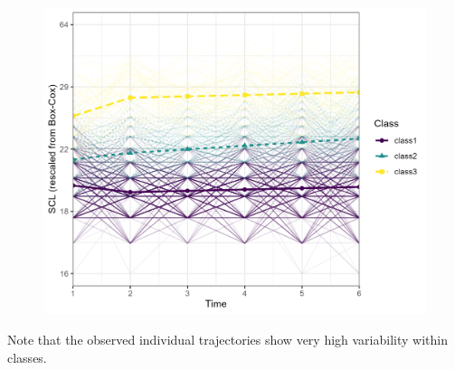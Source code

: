 \documentclass[
  man,floatsintext]{apa6}
\begin{document}
\begin{figure}
\includegraphics[width=0.5\linewidth]{appendices/plot_traj} \caption{ }\label{fig:unnamed-chunk-22}
\end{figure}

Note that the observed individual trajectories show very high variability within classes.
\end{document}

